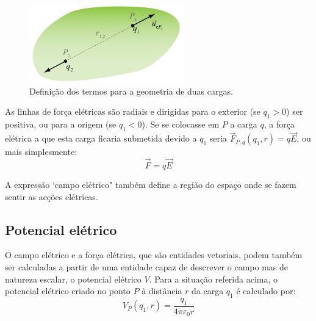 \documentclass[a4paper,twoside,12pt]{article}      %
\begin{document}
\begin{figure}[tb]
  \centering 
	\includegraphics[width=0.6\textwidth]{./fig1-thomson} 
	\caption{ Definição dos termos para a geometria de duas cargas. \label{fig:fig1}} 

\end{figure}
%
As linhas de força elétricas são radiais e dirigidas para o exterior (se $q_1>0$) ser positiva, ou para a origem (se $q_1<0$). Se se colocasse em $P$  a carga $q$,  a força elétrica a que esta carga ficaria submetida devido a $q_1$  seria	
$\vec{F}_{P,q} (q_1, r ) = q \vec{E}$, 
ou mais simplesmente:
\begin{equation}
\vec{F} = q \vec{E}
\end{equation}

A expressão `campo elétrico" também define a região do espaço onde se fazem sentir as acções elétricas.

\subsection{\sf Potencial elétrico}
	
O campo elétrico e a força elétrica, que são entidades vetoriais, podem também ser calculadas a partir de uma entidade capaz de descrever o campo mas de natureza escalar, o potencial elétrico $V$. Para a situação referida acima, o potencial elétrico criado no ponto $P$ à distância $r$ da carga $q_1$ é calculado por:
\begin{equation} \label{eq:pot_ele}
	V_P (q_1, r) = \frac{q_1}{4 \pi \varepsilon_0 r} 
\end{equation}
\end{document}
